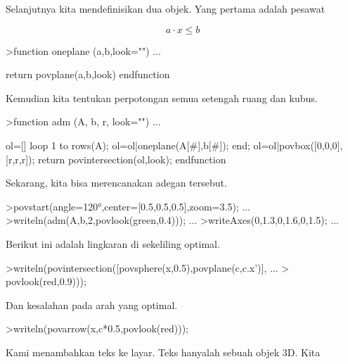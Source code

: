 \documentclass[a4paper,10pt]{article}
\begin{document}
\begin{eulernotebook}
\begin{eulercomment}
\begin{eulercomment}
\begin{eulercomment}
\begin{eulercomment}
\begin{eulercomment}
\begin{eulercomment}
\begin{eulercomment}
\begin{eulercomment}
\begin{eulercomment}
\begin{eulercomment}
\begin{eulercomment}
Selanjutnya kita mendefinisikan dua objek. Yang pertama adalah pesawat\\
\end{eulercomment}
\begin{eulerformula}
\[
a \cdot x \le b
\]
\end{eulerformula}
\begin{eulerprompt}
>function oneplane (a,b,look="") ...
\end{eulerprompt}
\begin{eulerudf}
    return povplane(a,b,look)
  endfunction
\end{eulerudf}
\begin{eulercomment}
Kemudian kita tentukan perpotongan semua setengah ruang dan kubus.
\end{eulercomment}
\begin{eulerprompt}
>function adm (A, b, r, look="") ...
\end{eulerprompt}
\begin{eulerudf}
    ol=[]
    loop 1 to rows(A); ol=ol|oneplane(A[#],b[#]); end;
    ol=ol|povbox([0,0,0],[r,r,r]);
    return povintersection(ol,look);
  endfunction
\end{eulerudf}
\begin{eulercomment}
Sekarang, kita bisa merencanakan adegan tersebut.
\end{eulercomment}
\begin{eulerprompt}
>povstart(angle=120°,center=[0.5,0.5,0.5],zoom=3.5); ...
>writeln(adm(A,b,2,povlook(green,0.4))); ...
>writeAxes(0,1.3,0,1.6,0,1.5); ...
\end{eulerprompt}
\begin{eulercomment}
Berikut ini adalah lingkaran di sekeliling optimal.
\end{eulercomment}
\begin{eulerprompt}
>writeln(povintersection([povsphere(x,0.5),povplane(c,c.x')], ...
>  povlook(red,0.9)));
\end{eulerprompt}
\begin{euleroutput}
  []
\end{euleroutput}
\begin{eulercomment}
Dan kesalahan pada arah yang optimal.
\end{eulercomment}
\begin{eulerprompt}
>writeln(povarrow(x,c*0.5,povlook(red)));
\end{eulerprompt}
\begin{eulercomment}
Kami menambahkan teks ke layar. Teks hanyalah sebuah objek 3D. Kita

\end{eulercomment}
\end{eulercomment}
\end{eulercomment}
\end{eulercomment}
\end{eulercomment}
\end{eulercomment}
\end{eulercomment}
\end{eulercomment}
\end{eulercomment}
\end{eulercomment}
\end{eulercomment}
\end{eulernotebook}
\end{document}
